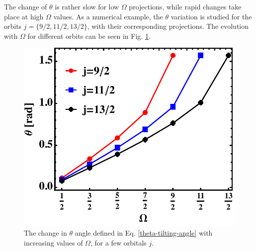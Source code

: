 The change of $\theta$ is rather slow for low $\Omega$ projections, while rapid changes take place at high $\Omega$ values. %
As a numerical example, the $\theta$ variation is studied for the orbits $j=\{9/2,11/2,13/2\}$, with their corresponding projections. The evolution with $\Omega$ for different orbits can be seen in Fig. \ref{fig-tilting-angle-shape}.
\begin{figure}
    \centering
    \includegraphics[scale=0.7]{Chapters/Figures/tilted_theta_shape.pdf}
    \caption{The change in $\theta$ angle defined in Eq. \ref{theta-tilting-angle} with increasing values of $\Omega$, for a few orbitals $j$.}
    \label{fig-tilting-angle-shape}
\end{figure}

